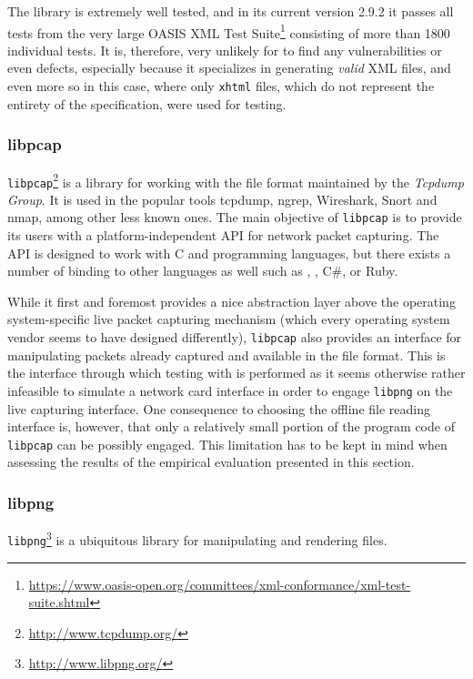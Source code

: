 The library is extremely well tested, and in its current version 2.9.2 it passes all tests from the very large
OASIS XML Test Suite\footnote{\url{https://www.oasis-open.org/committees/xml-conformance/xml-test-suite.shtml}}
consisting of more than 1800 individual tests. It is, therefore, very unlikely for \xmlmate to find any
vulnerabilities or even defects, especially because it specializes in generating \emph{valid} XML files, and
even more so in this case, where only \texttt{xhtml} files, which do not represent the entirety of the \xml
specification, were used for testing.

\subsubsection{libpcap}
\texttt{libpcap}\footnote{\url{http://www.tcpdump.org/}} is a library for working with the \pcap file format
maintained by the \emph{Tcpdump Group}. It is used in the popular tools tcpdump, ngrep, Wireshark, Snort and
nmap, among other less known ones. The main objective of \texttt{libpcap} is to provide its users with a
platform-independent API for network packet capturing. The API is designed to work with {\small C} and \cpp
programming languages, but there exists a number of binding to other languages as well such as \python, \java,
{\small C\#}, or {\small Ruby}.

While it first and foremost provides a nice abstraction layer above the operating system-specific live packet
capturing mechanism (which every operating system vendor seems to have designed differently), \texttt{libpcap}
also provides an interface for manipulating packets already captured and available in the \pcap file format.
This is the interface through which testing with \xmlmate is performed as it seems otherwise rather
infeasible to simulate a network card interface in order to engage \texttt{libpng} on the live capturing
interface. One consequence to choosing the offline  file reading interface is, however, that only a relatively
small portion of the program code of \texttt{libpcap} can be possibly engaged. This limitation has to be kept
in mind when assessing the results of the empirical evaluation presented in this section.

\subsubsection{libpng}
\texttt{libpng}\footnote{\url{http://www.libpng.org/}} is a ubiquitous library for manipulating and rendering
\png files.

